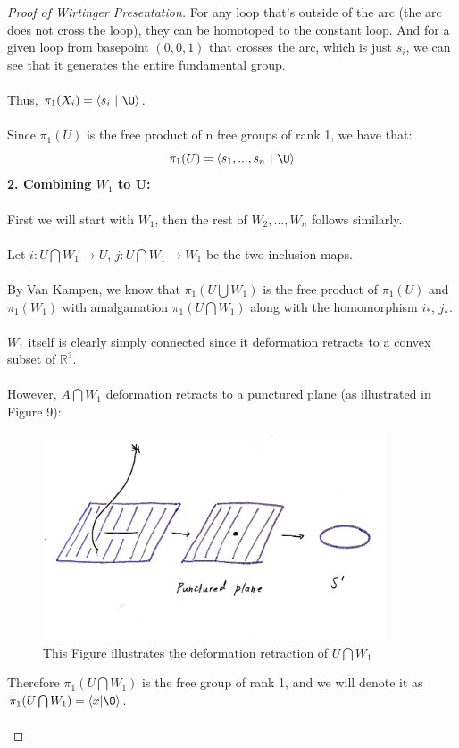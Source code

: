 \documentclass{article}
\begin{document}
\begin{proof}[Proof of Wirtinger Presentation]
\noindent For any loop that's outside of the arc (the arc does not cross the loop), they can be homotoped to the constant loop. And for a given loop from basepoint $(0, 0, 1)$ that crosses the arc, which is just $s_i$, we can see that it generates the entire fundamental group.\\\\
Thus, $\pi_1(X_i) = \langle s_i\ |\ \O\rangle$.\\\\
Since $\pi_1(U)$ is the free product of n free groups of rank 1, we have that:
\[\pi_1(U) = \langle s_1, ..., s_n\ |\ \O \rangle\]
{\bf 2. Combining $W_1$ to U:}\\\\
First we will start with $W_1$, then the rest of $W_2, ..., W_n$ follows similarly.\\\\
Let $i: U \bigcap W_1 \to U$, $j: U \bigcap W_1 \to W_1$ be the two inclusion maps.\\\\
By Van Kampen, we know that $\pi_1(U \bigcup W_1)$ is the free product of $\pi_1(U)$ and $\pi_1(W_1)$ with amalgamation $\pi_1(U \bigcap W_1)$ along with the homomorphism $i_*$, $j_*$.\\\\
$W_1$ itself is clearly simply connected since it deformation retracts to a convex subset of $\mathbb{R}^3$.\\\\
However, $A \bigcap W_1$ deformation retracts to a punctured plane (as illustrated in Figure 9):
	\begin{figure}[h!]
		\centering
		\captionsetup{width=.75\linewidth}
		\includegraphics[width=4in]{figures/def_retr.jpg}
		\caption{This Figure illustrates the deformation retraction of $U \bigcap W_1$}
		\label{fig:rtinstability}
	\end{figure}
Therefore $\pi_1(U \bigcap W_1)$ is the free group of rank 1, and we will denote it as $\pi_1(U \bigcap W_1) = \langle x |\O \rangle$.\\\\

\end{proof}
\end{document}
